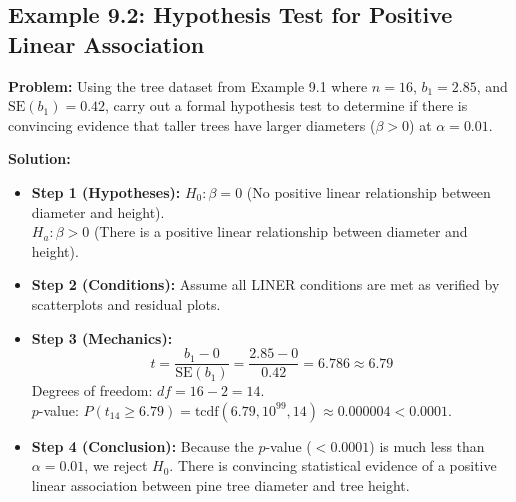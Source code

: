 \subsection*{Example 9.2: Hypothesis Test for Positive Linear Association}
\textbf{Problem:} Using the tree dataset from Example 9.1 where $n = 16$, $b_1 = 2.85$, and $\text{SE}(b_1) = 0.42$, carry out a formal hypothesis test to determine if there is convincing evidence that taller trees have larger diameters ($\beta > 0$) at $\alpha = 0.01$.

\textbf{Solution:}
\begin{itemize}[leftmargin=1.2em]
  \item \textbf{Step 1 (Hypotheses):}
  $H_0: \beta = 0$ (No positive linear relationship between diameter and height).\\
  $H_a: \beta > 0$ (There is a positive linear relationship between diameter and height).
  \item \textbf{Step 2 (Conditions):}
  Assume all LINER conditions are met as verified by scatterplots and residual plots.
  \item \textbf{Step 3 (Mechanics):}
  \[ t = \frac{b_1 - 0}{\text{SE}(b_1)} = \frac{2.85 - 0}{0.42} = 6.786 \approx 6.79 \]
  Degrees of freedom: $df = 16 - 2 = 14$.\\
  $p$-value: $P(t_{14} \ge 6.79) = \text{tcdf}(6.79, 10^{99}, 14) \approx 0.000004 < 0.0001$.
  \item \textbf{Step 4 (Conclusion):}
  Because the $p$-value ($< 0.0001$) is much less than $\alpha = 0.01$, we reject $H_0$. There is convincing statistical evidence of a positive linear association between pine tree diameter and tree height.
\end{itemize}

